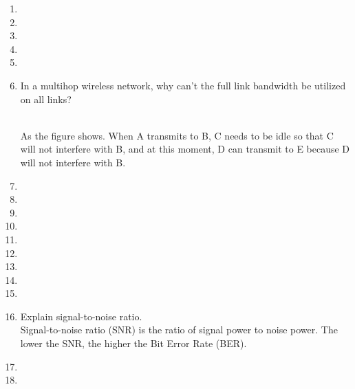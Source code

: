 \documentclass[10pt, a4paper]{article}
\begin{document}
\begin{enumerate}
\item\mbox{}
\item\mbox{}
\item\mbox{}
\item\mbox{}
\item\mbox{}
\item\mbox{} In a multihop wireless network, why can't the full link bandwidth be utilized on all links?\\
    \color{blue}
    \\
    As the figure shows. When A transmits to B, C needs to be idle so that C will not interfere with B, and at this moment, D can transmit to E because D will not interfere with B.
    \color{black}
\item\mbox{}
\item\mbox{}
\item\mbox{}
\item\mbox{}
\item\mbox{}
\item\mbox{}
\item\mbox{}
\item\mbox{}
\item\mbox{}
\item\mbox{} Explain signal-to-noise ratio.\\
    \color{blue}
    Signal-to-noise ratio (SNR) is the ratio of signal power to noise power. The lower the SNR, the higher the Bit Error Rate (BER).
    \color{black}
\item\mbox{}
\item\mbox{}
\end{enumerate}
\end{document}
